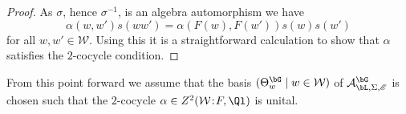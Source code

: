 \documentclass[eqthmnum,nocolour,skinny]{jt-calcs}
\newcommand\sd{
	\mathchoice{\mkern1.5mu}{\mkern1.5mu}{}{}%
	{:}%
	\mathchoice{\mkern1.5mu}{\mkern1.5mu}{}{}
}
\begin{document}
\begin{proof}
As $\sigma$, hence $\sigma^{-1}$, is an algebra automorphism we have
\begin{equation*}
\alpha(w,w')s(ww') = \alpha(F(w),F(w'))s(w)s(w')
\end{equation*}
for all $w,w' \in \mathcal{W}$. Using this it is a straightforward calculation to show that $\alpha$ satisfies the $2$-cocycle condition.
%
\end{proof}

\begin{assumption}
From this point forward we assume that the basis $(\Theta_w^{\bG} \mid w \in \mathcal{W})$ of $\mathcal{A}_{\bL,\Sigma,\mathscr{E}}^{\bG}$ is chosen such that the $2$-cocycle $\alpha \in Z^2(\mathcal{W}\sd F,\Ql)$ is unital.
\end{assumption}
\end{document}
